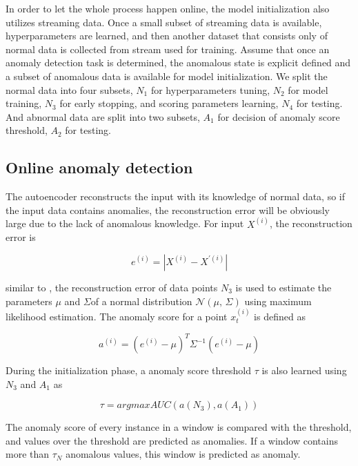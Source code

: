 In order to let the whole process happen online, the model initialization also utilizes streaming data. Once a small subset of streaming data is available, hyperparameters are learned, and then another dataset that consists only of normal data is collected from stream used for training. Assume that once an anomaly detection task is determined, the anomalous state is explicit defined and a subset of anomalous data is available for model initialization. We split the normal data into four subsets, $N_1$ for hyperparameters tuning, $N_2$ for model training, $N_3$ for early stopping, and scoring parameters learning, $N_4$ for testing. And abnormal data are split into two subsets, $A_1$ for decision of anomaly score threshold, $A_2$ for testing.

\subsection{Online anomaly detection}
\label{anomalydetection}
The autoencoder reconstructs the input with its knowledge of normal data, so if the input data contains anomalies, the reconstruction error will be obviously large due to the lack of anomalous knowledge. For input $X^{(i)}$, the reconstruction error is 

\begin{equation} \label{eq:error}
e^{(i)}=\left| X^{(i)} - X^{'(i)} \right|
\end{equation}

similar to \cite{encdecad}, the reconstruction error of data points $N_3$ is used to estimate the parameters $\mu$ and $\Sigma$of a normal distribution $\mathcal{N}(\mu,\,\Sigma)$ using maximum likelihood estimation. The anomaly score for a point $x_t^{(i)}$ is defined as 

\begin{equation} \label{eq:score}
a^{(i)}={(e^{(i)}-\mu)}^{T}{\Sigma}^{-1}{(e^{(i)}-\mu)}
\end{equation}

During the initialization phase, a anomaly score threshold $\tau$ is also learned using $N_3$ and $A_1$ as

\begin{equation} \label{eq:threshold}
\tau = argmax AUC(a(N_3),a(A_1))
\end{equation}

The anomaly score of every instance in a window is compared with the threshold, and values over the threshold are predicted as anomalies. If a window contains more than $\tau_N$ anomalous values, this window is predicted as anomaly.




